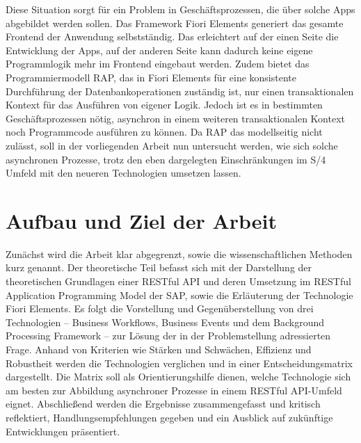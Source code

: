 Diese Situation sorgt für ein Problem in Geschäftsprozessen, die über solche Apps abgebildet werden sollen. Das Framework Fiori Elements generiert das gesamte Frontend der Anwendung selbstständig. Das erleichtert auf der einen Seite die Entwicklung der Apps, auf der anderen Seite kann dadurch keine eigene Programmlogik mehr im Frontend eingebaut werden. Zudem bietet das Programmiermodell RAP, das in Fiori Elements für eine konsistente Durchführung der Datenbankoperationen zuständig ist, nur einen transaktionalen Kontext für das Ausführen von eigener Logik. Jedoch ist es in bestimmten Geschäftsprozessen nötig, asynchron in einem weiteren transaktionalen Kontext noch Programmcode ausführen zu können. Da RAP das modellseitig nicht zulässt, soll in der vorliegenden Arbeit nun untersucht werden, wie sich solche asynchronen Prozesse, trotz den eben dargelegten Einschränkungen im S/4 Umfeld mit den neueren Technologien umsetzen lassen.


\section{Aufbau und Ziel der Arbeit}

Zunächst wird die Arbeit klar abgegrenzt, sowie die wissenschaftlichen Methoden kurz genannt. Der theoretische Teil befasst sich mit der Darstellung der theoretischen Grundlagen einer RESTful API und deren Umsetzung im RESTful Application Programming Model der SAP, sowie die Erläuterung der Technologie Fiori Elements. Es folgt die Vorstellung und Gegenüberstellung von drei Technologien – Business Workflows, Business Events und dem Background Processing Framework – zur Lösung der in der Problemstellung adressierten Frage. Anhand von Kriterien wie Stärken und Schwächen, Effizienz und Robustheit werden die Technologien verglichen und in einer Entscheidungsmatrix dargestellt. Die Matrix soll als Orientierungshilfe dienen, welche Technologie sich am besten zur Abbildung asynchroner Prozesse in einem RESTful API-Umfeld eignet. Abschlie{\ss}end werden die Ergebnisse zusammengefasst und kritisch reflektiert, Handlungsempfehlungen gegeben und ein Ausblick auf zukünftige Entwicklungen präsentiert.

